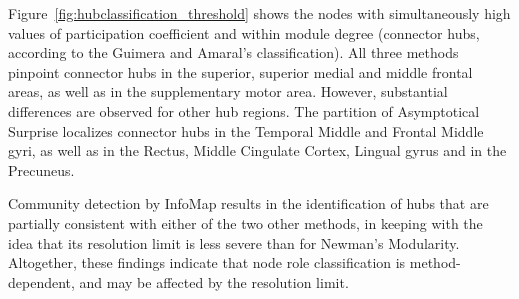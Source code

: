 Figure~\ref{fig:hubclassification_threshold} shows the nodes with simultaneously high values of participation coefficient and within module degree (connector hubs, according to the Guimera and Amaral's classification).
All three methods pinpoint connector hubs in the superior, superior medial and middle frontal areas, as well as in the supplementary motor area.
However, substantial differences are observed for other hub regions. The partition of Asymptotical Surprise localizes connector hubs in the Temporal Middle and Frontal Middle gyri, as well as in the Rectus, Middle Cingulate Cortex, Lingual gyrus and in the Precuneus.

Community detection by InfoMap results in the identification of hubs that are partially consistent with either of the two other methods, in keeping with the idea that its resolution limit is less severe than for Newman's Modularity.
Altogether, these findings indicate that node role classification is method-dependent, and may be affected by the resolution limit.

